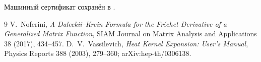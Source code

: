 Машинный сертификат сохранён в
.

\begin{thebibliography}{9}
V.~Noferini, \emph{A Daleckii--Krein Formula for the Fr\'echet Derivative
of a Generalized Matrix Function}, SIAM Journal on Matrix Analysis and
Applications 38 (2017), 434--457.
D.~V.~Vassilevich, \emph{Heat Kernel Expansion: User's Manual}, Physics
Reports 388 (2003), 279--360; arXiv:hep-th/0306138.
\end{thebibliography}
